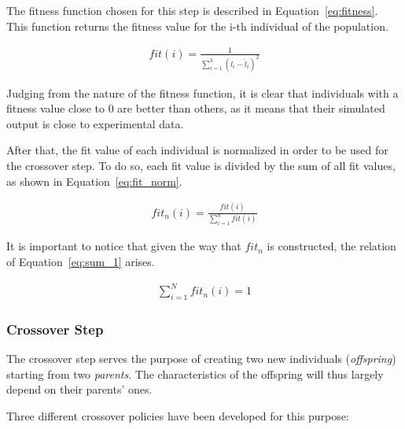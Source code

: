 The fitness function chosen for this step is described in Equation~\ref{eq:fitness}.
This function returns the fitness value for the i-th individual of the population.

\begin{align}
fit(i) = \frac{1}{\sum_{i=1}^k{\left(l_i-\hat{l}_i\right)^2}}
\label{eq:fitness}
\end{align}

Judging from the nature of the fitness function, it is clear that
individuals with a fitness value close to 0 are better than others,
as it means that their simulated output is close to experimental data.

After that, the fit value of each individual is normalized in order to be used
for the crossover step. To do so, each fit value is divided by the sum of all fit values,
as shown in Equation~\ref{eq:fit_norm}.

\begin{align}
fit_n(i) = \frac{fit(i)}{\sum_{i=1}^n fit(i)}
\label{eq:fit_norm}
\end{align}

It is important to notice that given the way that $fit_n$ is constructed,
the relation of Equation~\ref{eq:sum_1} arises.

\begin{align}
\sum_{i=1}^N fit_n(i) = 1
\label{eq:sum_1}
\end{align}

\subsubsection{Crossover Step}


The crossover step serves the purpose of creating two new individuals (\textit{offspring})
starting from two \textit{parents}. The characteristics of the offspring will thus
largely depend on their parents' ones.

Three different crossover policies have been developed for this purpose:


